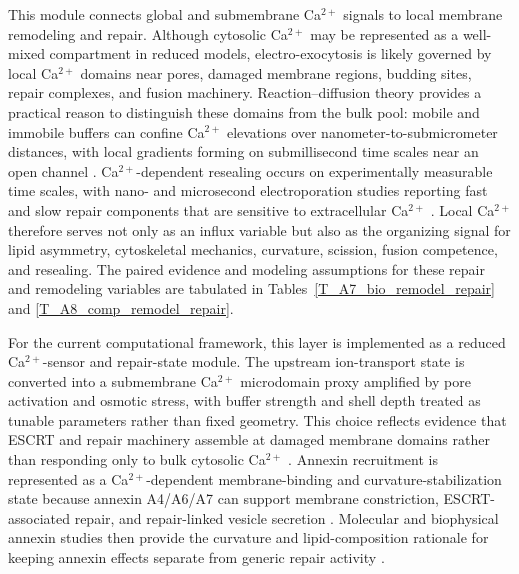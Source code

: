 \documentclass[Afour,sagev,times]{sagej}
\begin{document}
This module connects global and submembrane Ca$^{2+}$ signals to local membrane remodeling and repair. Although cytosolic Ca$^{2+}$ may be represented as a well-mixed compartment in reduced models, electro-exocytosis is likely governed by local Ca$^{2+}$ domains near pores, damaged membrane regions, budding sites, repair complexes, and fusion machinery. Reaction--diffusion theory provides a practical reason to distinguish these domains from the bulk pool: mobile and immobile buffers can confine Ca$^{2+}$ elevations over nanometer-to-submicrometer distances, with local gradients forming on submillisecond time scales near an open channel \cite{naraghi1997linearized}. Ca$^{2+}$-dependent resealing occurs on experimentally measurable time scales, with nano- and microsecond electroporation studies reporting fast and slow repair components that are sensitive to extracellular Ca$^{2+}$ \cite{bhattacharya2022calcium}. Local Ca$^{2+}$ therefore serves not only as an influx variable but also as the organizing signal for lipid asymmetry, cytoskeletal mechanics, curvature, scission, fusion competence, and resealing. The paired evidence and modeling assumptions for these repair and remodeling variables are tabulated in Tables~\ref{T_A7_bio_remodel_repair} and \ref{T_A8_comp_remodel_repair}.

For the current computational framework, this layer is implemented as a reduced Ca$^{2+}$-sensor and repair-state module. The upstream ion-transport state is converted into a submembrane Ca$^{2+}$ microdomain proxy amplified by pore activation and osmotic stress, with buffer strength and shell depth treated as tunable parameters rather than fixed geometry. This choice reflects evidence that ESCRT and repair machinery assemble at damaged membrane domains rather than responding only to bulk cytosolic Ca$^{2+}$ \cite{scheffer2014mechanism,shukla2022vitro}. Annexin recruitment is represented as a Ca$^{2+}$-dependent membrane-binding and curvature-stabilization state because annexin A4/A6/A7 can support membrane constriction, ESCRT-associated repair, and repair-linked vesicle secretion \cite{boye2017annexin,sonder2019annexin,muratori2021role,williams2023annexin}. Molecular and biophysical annexin studies then provide the curvature and lipid-composition rationale for keeping annexin effects separate from generic repair activity \cite{mularski2022interplay,hakamiZanjani2024modulation}.
\end{document}
